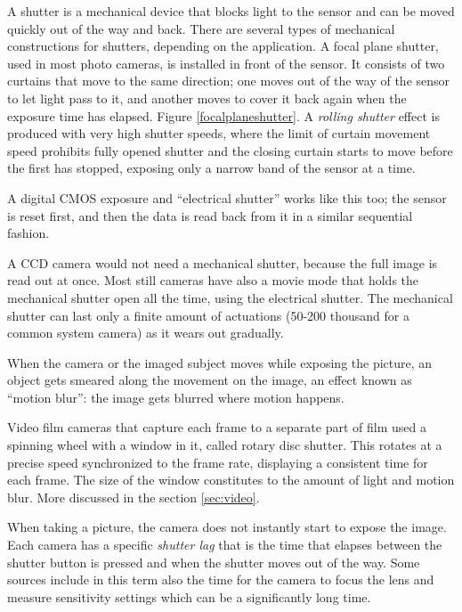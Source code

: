 A shutter is a mechanical device that blocks light to the sensor and can be moved quickly out of the way and back.
There are several types of mechanical constructions for shutters, depending on the application.
A focal plane shutter, used in most photo cameras, is installed in front of the sensor.
It consists of two curtains that move to the same direction; one moves out of the way of the sensor to let light pass to it, and another moves to cover it back again when the exposure time has elapsed.
Figure \ref{focalplaneshutter}.
A \emph{rolling shutter} effect is produced with very high shutter speeds, where the limit of curtain movement speed prohibits fully opened shutter and the closing curtain starts to move before the first has stopped, exposing only a narrow band of the sensor at a time.

A digital CMOS exposure and ``electrical shutter'' works like this too; the sensor is reset first, and then the data is read back from it in a similar sequential fashion.

A CCD camera would not need a mechanical shutter, because the full image is read out at once.
Most still cameras have also a movie mode that holds the mechanical shutter open all the time, using the electrical shutter.
The mechanical shutter can last only a finite amount of actuations (50-200 thousand for a common system camera) as it wears out gradually.

%



When the camera or the imaged subject moves while exposing the picture, an object gets smeared along the movement on the image, an effect known as ``motion blur'': the image gets blurred where motion happens.

Video film cameras that capture each frame to a separate part of film used a spinning wheel with a window in it, called rotary disc shutter.\cite{wilson2004anton}
This rotates at a precise speed synchronized to the frame rate, displaying a consistent time for each frame.
The size of the window constitutes to the amount of light and motion blur. More discussed in the section \ref{sec:video}.

When taking a picture, the camera does not instantly start to expose the image.
Each camera has a specific \emph{shutter lag} that is the time that elapses between the shutter button is pressed and when the shutter moves out of the way.
Some sources include in this term also the time for the camera to focus the lens and measure sensitivity settings which can be a significantly long time.

